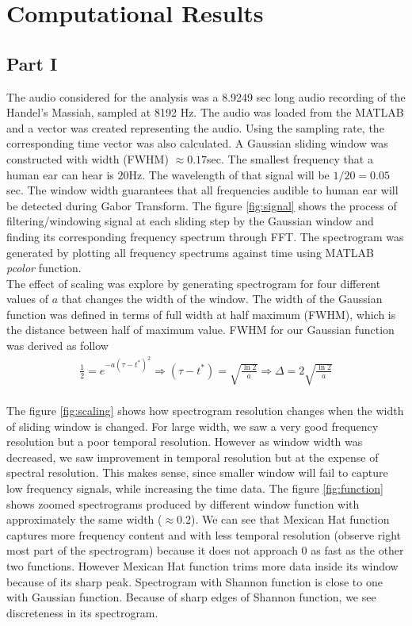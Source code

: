 \documentclass{article}
\begin{document}
\section{Computational Results}\label{Result}
\subsection{Part I}
The audio considered for the analysis was a 8.9249 sec long audio recording of the Handel's Massiah, sampled at 8192 Hz. The audio was loaded from the MATLAB and a vector was created representing the audio. Using the sampling rate, the corresponding time vector was also calculated. A Gaussian sliding window was constructed with width (FWHM) $\approx 0.17$sec. The smallest frequency that a human ear can hear is $20$Hz. The wavelength of that signal will be $1/20 = 0.05$ sec. The window width guarantees that all frequencies audible to human ear will be detected during Gabor Transform. The figure \ref{fig:signal} shows
the process of filtering/windowing signal at each sliding step by the Gaussian window and finding its corresponding frequency spectrum through FFT. The spectrogram was generated by plotting all frequency spectrums against time using MATLAB \textit{pcolor} function. \\

The effect of scaling was explore by generating spectrogram for four different values of $a$ that changes the width of the window. 
The width of the Gaussian function was defined in terms of full width at half maximum (FWHM), which is the distance between half of maximum value. FWHM for our Gaussian function was derived as follow
\begin{align*}
\frac{1}{2} = e^{-a(\tau - t^*)^2} \Longrightarrow (\tau-t^*) = \sqrt{\frac{\ln2}{a}} \Longrightarrow \Delta = 2\sqrt{\frac{\ln2}{a}} \\
\end{align*}

The figure \ref{fig:scaling} shows how spectrogram resolution changes when the width of sliding window is changed. For large width, we saw a very good frequency resolution but a poor temporal resolution. However as window width was decreased, we saw improvement in temporal resolution but at the expense of spectral resolution. This makes sense, since smaller window will fail to capture low frequency signals, while increasing the time data. 
The figure \ref{fig:function} shows zoomed spectrograms produced by different window function with approximately the same width ($\approx 0.2$).  We can see that Mexican Hat function captures more frequency content and with less temporal resolution (observe right most part of the spectrogram) because it does not approach $0$ as fast as the other two functions. However Mexican Hat function trims more data inside its window because of its sharp peak. Spectrogram with Shannon function is close to one with Gaussian function. Because of sharp edges of Shannon function, we see discreteness in its spectrogram.
\end{document}
